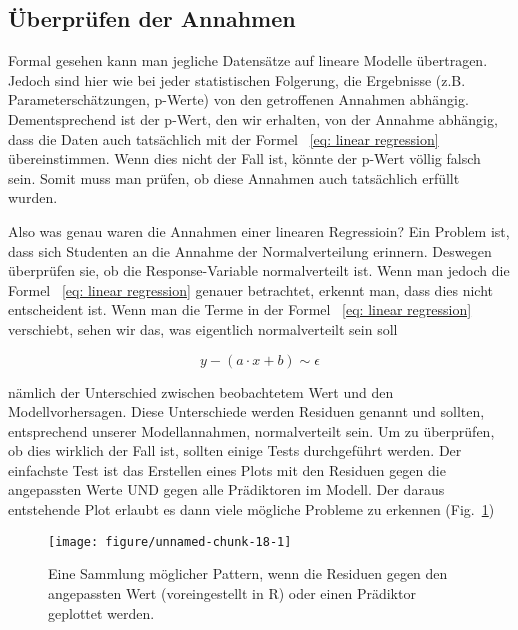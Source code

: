 \documentclass[a4paper,twoside]{tufte-book}\usepackage[]{graphicx}\usepackage[]{color}
\makeatletter
\def\maxwidth{ %
	\ifdim\Gin@nat@width>\linewidth
	\linewidth
	\else
	\Gin@nat@width
	\fi
}
\makeatother
\begin{document}
\subsection{Überprüfen der Annahmen}

Formal gesehen kann man jegliche Datensätze auf lineare Modelle übertragen. Jedoch sind hier wie bei jeder statistischen Folgerung, die Ergebnisse (z.B. Parameterschätzungen, p-Werte) von den getroffenen Annahmen abhängig. Dementsprechend ist der p-Wert, den wir erhalten, von der Annahme abhängig, dass die Daten auch tatsächlich mit der Formel ~\ref{eq: linear regression} übereinstimmen. Wenn dies nicht der Fall ist, könnte der p-Wert völlig falsch sein. Somit muss man prüfen, ob diese Annahmen auch tatsächlich erfüllt wurden.

Also was genau waren die Annahmen einer linearen Regressioin? Ein Problem ist, dass sich Studenten an die Annahme der Normalverteilung erinnern. Deswegen überprüfen sie, ob die Response-Variable normalverteilt ist. Wenn man jedoch die Formel ~\ref{eq: linear regression} genauer betrachtet, erkennt man, dass dies nicht entscheident ist. Wenn man die Terme in der Formel ~\ref{eq: linear regression} verschiebt,
sehen wir das, was eigentlich normalverteilt sein soll

\begin{equation} \label{eq: linear regression}
y - (a \cdot x + b ) \sim \epsilon 
\end{equation}

nämlich der Unterschied zwischen beobachtetem Wert und den Modellvorhersagen. Diese Unterschiede werden Residuen genannt und sollten, entsprechend unserer Modellannahmen, normalverteilt sein. Um zu überprüfen, ob dies wirklich der Fall ist, sollten einige Tests durchgeführt werden. Der einfachste Test ist das Erstellen eines Plots mit den Residuen gegen die angepassten Werte UND gegen alle Prädiktoren im Modell. Der daraus entstehende Plot erlaubt es dann viele mögliche Probleme zu erkennen (Fig.~\ref{fig: ResidualPatterns})

\begin{figure}[htbp]
\begin{center}
\begin{Schunk}

\texttt{[image: figure/unnamed-chunk-18-1]} \end{Schunk}
\caption{Eine Sammlung möglicher Pattern, wenn die Residuen gegen den angepassten Wert (voreingestellt in R) oder einen Prädiktor geplottet werden.}
\label{fig: ResidualPatterns}
\end{center}
\end{figure}
\end{document}
